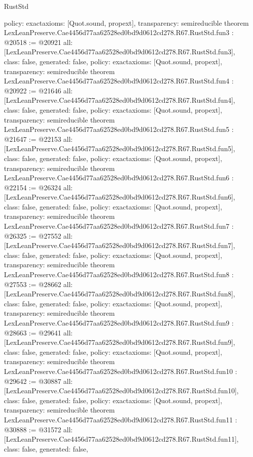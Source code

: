 \begin{lexlean}{RustStd}
\begin{coremodule}
{  policy: exact{axioms: [Quot.sound, propext]},
  transparency: semireducible
}
theorem LexLeanPreserve.Cae4456d77aa62528ed0bd9d0612cd278.R67.RustStd.fun3 : @20518 := @20921 {
  all: [LexLeanPreserve.Cae4456d77aa62528ed0bd9d0612cd278.R67.RustStd.fun3],
  class: false,
  generated: false,
  policy: exact{axioms: [Quot.sound, propext]},
  transparency: semireducible
}
theorem LexLeanPreserve.Cae4456d77aa62528ed0bd9d0612cd278.R67.RustStd.fun4 : @20922 := @21646 {
  all: [LexLeanPreserve.Cae4456d77aa62528ed0bd9d0612cd278.R67.RustStd.fun4],
  class: false,
  generated: false,
  policy: exact{axioms: [Quot.sound, propext]},
  transparency: semireducible
}
theorem LexLeanPreserve.Cae4456d77aa62528ed0bd9d0612cd278.R67.RustStd.fun5 : @21647 := @22153 {
  all: [LexLeanPreserve.Cae4456d77aa62528ed0bd9d0612cd278.R67.RustStd.fun5],
  class: false,
  generated: false,
  policy: exact{axioms: [Quot.sound, propext]},
  transparency: semireducible
}
theorem LexLeanPreserve.Cae4456d77aa62528ed0bd9d0612cd278.R67.RustStd.fun6 : @22154 := @26324 {
  all: [LexLeanPreserve.Cae4456d77aa62528ed0bd9d0612cd278.R67.RustStd.fun6],
  class: false,
  generated: false,
  policy: exact{axioms: [Quot.sound, propext]},
  transparency: semireducible
}
theorem LexLeanPreserve.Cae4456d77aa62528ed0bd9d0612cd278.R67.RustStd.fun7 : @26325 := @27552 {
  all: [LexLeanPreserve.Cae4456d77aa62528ed0bd9d0612cd278.R67.RustStd.fun7],
  class: false,
  generated: false,
  policy: exact{axioms: [Quot.sound, propext]},
  transparency: semireducible
}
theorem LexLeanPreserve.Cae4456d77aa62528ed0bd9d0612cd278.R67.RustStd.fun8 : @27553 := @28662 {
  all: [LexLeanPreserve.Cae4456d77aa62528ed0bd9d0612cd278.R67.RustStd.fun8],
  class: false,
  generated: false,
  policy: exact{axioms: [Quot.sound, propext]},
  transparency: semireducible
}
theorem LexLeanPreserve.Cae4456d77aa62528ed0bd9d0612cd278.R67.RustStd.fun9 : @28663 := @29641 {
  all: [LexLeanPreserve.Cae4456d77aa62528ed0bd9d0612cd278.R67.RustStd.fun9],
  class: false,
  generated: false,
  policy: exact{axioms: [Quot.sound, propext]},
  transparency: semireducible
}
theorem LexLeanPreserve.Cae4456d77aa62528ed0bd9d0612cd278.R67.RustStd.fun10 : @29642 := @30887 {
  all: [LexLeanPreserve.Cae4456d77aa62528ed0bd9d0612cd278.R67.RustStd.fun10],
  class: false,
  generated: false,
  policy: exact{axioms: [Quot.sound, propext]},
  transparency: semireducible
}
theorem LexLeanPreserve.Cae4456d77aa62528ed0bd9d0612cd278.R67.RustStd.fun11 : @30888 := @31572 {
  all: [LexLeanPreserve.Cae4456d77aa62528ed0bd9d0612cd278.R67.RustStd.fun11],
  class: false,
  generated: false,
}
\end{coremodule}
\end{lexlean}
